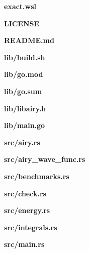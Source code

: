 \documentclass[11pt,DIV=10,final]{scrreprt} %
\begin{document}
\begin{appendix}
{\vspace*{3ex}
{\noindent \large \bfseries exact.wsl}


\vspace*{3ex}
{\noindent \large \bfseries LICENSE}


\vspace*{3ex}
{\noindent \large \bfseries README.md}


\vspace*{3ex}
{\noindent \large \bfseries lib/build.sh}


\vspace*{3ex}
{\noindent \large \bfseries lib/go.mod}


\vspace*{3ex}
{\noindent \large \bfseries lib/go.sum}


\vspace*{3ex}
{\noindent \large \bfseries lib/libairy.h}


\vspace*{3ex}
{\noindent \large \bfseries lib/main.go}


\vspace*{3ex}
{\noindent \large \bfseries src/airy.rs}


\vspace*{3ex}
{\noindent \large \bfseries src/airy\_wave\_func.rs}


\vspace*{3ex}
{\noindent \large \bfseries src/benchmarks.rs}


\vspace*{3ex}
{\noindent \large \bfseries src/check.rs}


\vspace*{3ex}
{\noindent \large \bfseries src/energy.rs}


\vspace*{3ex}
{\noindent \large \bfseries src/integrals.rs}


\vspace*{3ex}
{\noindent \large \bfseries src/main.rs}


}
\end{appendix}
\end{document}
